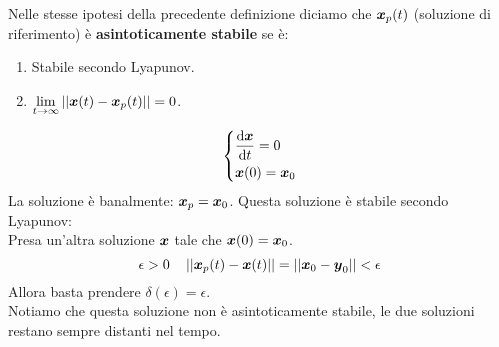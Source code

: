 \noindent
\begin{defn}
    Nelle stesse ipotesi della precedente definizione diciamo che $\boldsymbol{x}_p(t)$ (soluzione di riferimento) è \textbf{asintoticamente stabile} se è:
    \begin{enumerate}
        \item Stabile secondo Lyapunov.
	\item $\lim\limits_{t \to \infty} \left|\left|\boldsymbol{x}(t)-\boldsymbol{x}_p(t)\right|\right| = 0$.
    \end{enumerate}
\end{defn}
\noindent
\begin{exmp}
    \[\begin{dcases}
        \frac{\text{d} \boldsymbol{x}}{\text{d} t} = 0\\
	\boldsymbol{x}(0)=\boldsymbol{x}_0
    \end{dcases}\] 
    La soluzione è banalmente: $\boldsymbol{x}_p = \boldsymbol{x}_0$. Questa soluzione è stabile secondo Lyapunov:\\
    Presa un'altra soluzione $\boldsymbol{x}$ tale che $\boldsymbol{x} (0)=\boldsymbol{x}_0$.
    \[
	\epsilon >0 \quad \left|\left|\boldsymbol{x}_p(t) - \boldsymbol{x} (t)\right|\right|=
	\left|\left|\boldsymbol{x}_0 - \boldsymbol{y}_0 \right|\right| < \epsilon
    \] 
    Allora basta prendere $\delta (\epsilon) = \epsilon$.\\
    Notiamo che questa soluzione non è asintoticamente stabile, le due soluzioni restano sempre distanti nel tempo.
\end{exmp}
\noindent

